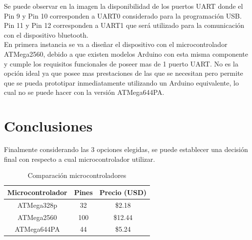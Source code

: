 Se puede observar en la imagen la disponibilidad de los puertos UART donde el Pin 9 y Pin 10 corresponden a UART0 considerado para la programación USB. Pin 11 y Pin 12 corresponden a UART1 que será utilizado para la comunicación con el dispositivo bluetooth.\\
En primera instancia se va a diseñar el dispositivo con el microcontrolador ATMega2560, debido a que existen modelos Arduino con esta misma componente y cumple los requisitos funcionales de poseer mas de 1 puerto UART. No es la opción ideal ya que posee mas prestaciones de las que se necesitan pero permite que se pueda prototipar inmediatamente  utilizando un Arduino equivalente, lo cual no se puede hacer con la versión ATMega644PA.

\section{Conclusiones}
Finalmente considerando las 3 opciones elegidas, se puede establecer una decisión final con respecto a cual microcontrolador utilizar.


\begin{table}[H]
\centering
\begin{tabular}{| c | c | c |}
\hline
\multicolumn{1}{|c|}{\textbf{Microcontrolador}}&
\multicolumn{1}{c|}{\textbf{Pines}}&
\multicolumn{1}{|c|}{\textbf{Precio (USD)}}\\ \hline
ATMega328p  & 32  & \$2.18  \\ \hline
ATMega2560  & 100 & \$12.44 \\ \hline
ATMega644PA & 44  & \$5.24  \\ \hline
\end{tabular}
\caption{Comparación microcontroladores}
\label{tablacompara}
\end{table}

